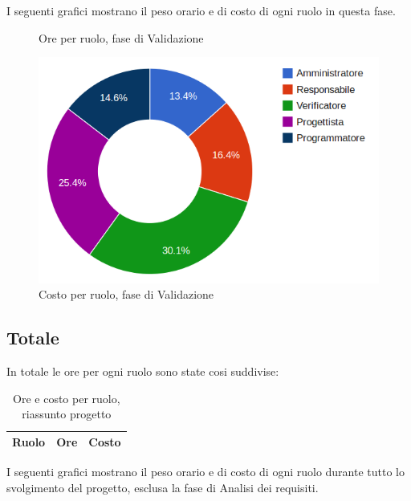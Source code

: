 I seguenti grafici mostrano il peso orario e di costo di ogni ruolo in questa fase.

\begin{figure}[H]
\begin{tikzpicture}

	

\end{tikzpicture}\caption{Ore per ruolo, fase di Validazione}
\end{figure}

\begin{figure}[H]
\centering
\includegraphics[scale=0.35]{5-4-2.png}
\caption{Costo per ruolo, fase di Validazione\label{fig:nome}}
\end{figure}

\subsection{Totale}

In totale le ore per ogni ruolo sono state cosi suddivise:

\begin{table}[H]
	\centering
	\begin{tabular}{ l c c }
	\textbf{Ruolo} & \textbf{Ore} & \textbf{Costo} \\
	\hline
	
		
	
	\end{tabular}
	\caption{Ore e costo per ruolo, riassunto progetto}
	\end{table}

I seguenti grafici mostrano il peso orario e di costo di ogni ruolo durante tutto lo svolgimento del progetto, esclusa la fase di Analisi dei requisiti.


